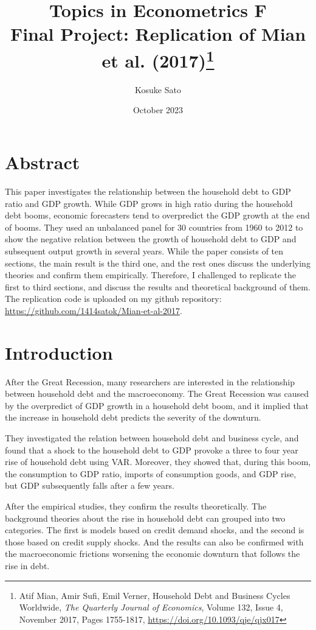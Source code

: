 \documentclass{ltjarticle}
\title{Topics in Econometrics F\\Final Project: Replication of Mian et al. (2017)\footnote{Atif Mian, Amir Sufi, Emil Verner, Household Debt and Business Cycles Worldwide, \textit{The Quarterly Journal of Economics}, Volume 132, Issue 4, November 2017, Pages 1755-1817, \href{run: https://doi.org/10.1093/qje/qjx017}{https://doi.org/10.1093/qje/qjx017}}}
\author{Kosuke Sato}
\date{October 2023}
\begin{document}
\maketitle

\section*{Abstract}
This paper investigates the relationship between the household debt to GDP ratio and GDP growth. While GDP grows in high ratio during the household debt booms, economic forecasters tend to overpredict the GDP growth at the end of booms. They used an unbalanced panel for 30 countries from 1960 to 2012 to show the negative relation between the growth of household debt to GDP and subsequent output growth in several years. While the paper consists of ten sections, the main result is the third one, and the rest ones discuss the underlying theories and confirm them empirically. Therefore, I challenged to replicate the first to third sections, and discuss the results and theoretical background of them. The replication code is uploaded on my github repository: \href{run:https://github.com/1414satok/Mian-et-al-2017}{https://github.com/1414satok/Mian-et-al-2017}.
\newpage

\section{Introduction}
After the Great Recession, many researchers are interested in the relationship between household debt and the macroeconomy. The Great Recession was caused by the overpredict of GDP growth in a household debt boom, and it implied that the increase in household debt predicts the severity of the downturn. 

They investigated the relation between household debt and business cycle, and found that a shock to the household debt to GDP provoke a three to four year rise of household debt using VAR. Moreover, they showed that, during this boom, the consumption to GDP ratio, imports of consumption goods, and GDP rise, but GDP subsequently falls after a few years. 

After the empirical studies, they confirm the results theoretically. The background theories about the rise in household debt can grouped into two categories. The first is models based on credit demand shocks, and the second is those based on credit supply shocks. And the results can also be confirmed with the macroeconomic frictions worsening the economic downturn that follows the rise in debt.
\end{document}
